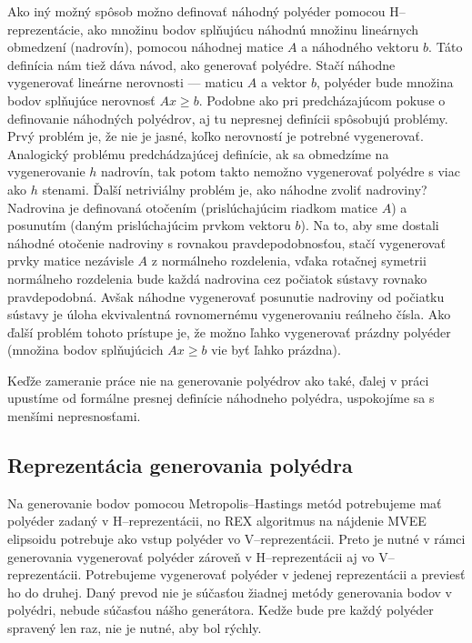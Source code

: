 Ako iný možný spôsob možno definovať náhodný polyéder pomocou H--reprezentácie, ako množinu bodov splňujúcu náhodnú množinu lineárnych obmedzení (nadrovín), pomocou náhodnej matice $A$ a náhodného vektoru $b$. Táto definícia nám tiež dáva návod, ako generovať polyédre. Stačí náhodne vygenerovať lineárne nerovnosti --- maticu $A$ a vektor $b$, polyéder bude množina bodov splňujúce nerovnosť $Ax\geq b$. Podobne ako pri predcházajúcom pokuse o definovanie náhodných polyédrov, aj tu nepresnej definícii spôsobujú problémy. Prvý problém je, že nie je jasné, koľko nerovností je potrebné vygenerovať. Analogický problému predchádzajúcej definície, ak sa obmedzíme na vygenerovanie $h$ nadrovín, tak potom takto nemožno vygenerovať polyédre s viac ako $h$ stenami.
Ďalší netriviálny problém je, ako náhodne zvoliť nadroviny? Nadrovina je definovaná otočením (prislúchajúcim riadkom matice $A$) a posunutím (daným prislúchajúcim prvkom vektoru $b$). Na to, aby sme dostali náhodné otočenie nadroviny s rovnakou pravdepodobnosťou, stačí vygenerovať prvky matice nezávisle $A$ z normálneho rozdelenia, vďaka rotačnej symetrii normálneho rozdelenia bude každá nadrovina cez počiatok sústavy rovnako pravdepodobná. Avšak náhodne vygenerovať posunutie nadroviny od počiatku sústavy je úloha ekvivalentná rovnomernému vygenerovaniu reálneho čísla. Ako ďalší problém tohoto prístupe je, že možno ľahko vygenerovať prázdny polyéder (množina bodov splňujúcich $Ax \geq b$ vie byť ľahko prázdna).

Keďže zameranie práce nie na generovanie polyédrov ako také, ďalej v práci upustíme od formálne presnej definície náhodneho polyédra, uspokojíme sa s menšími nepresnosťami.\\

\subsection{Reprezentácia generovania polyédra}
Na generovanie bodov pomocou Metropolis--Hastings metód potrebujeme mať polyéder zadaný v H--reprezentácii, no REX algoritmus na nájdenie MVEE elipsoidu potrebuje ako vstup polyéder vo V--reprezentácii. Preto je nutné v rámci generovania vygenerovať polyéder zároveň v H--reprezentácii aj vo V--reprezentácii. Potrebujeme vygenerovať polyéder v jedenej reprezentácii a previesť ho do druhej. Daný prevod nie je súčasťou žiadnej metódy generovania bodov v polyédri, nebude súčasťou nášho generátora. Kedže bude pre každý polyéder spravený len raz, nie je nutné, aby bol rýchly.\\

